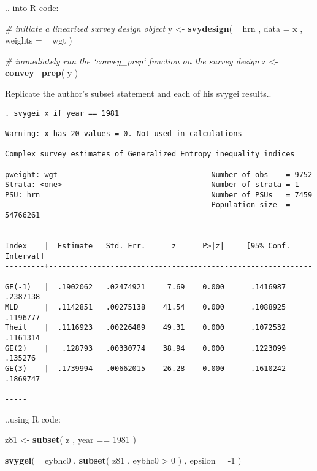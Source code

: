 \documentclass[]{book}
\newenvironment{Shaded}{\begin{snugshade}}{\end{snugshade}}
\newcommand{\KeywordTok}[1]{\textcolor[rgb]{0.13,0.29,0.53}{\textbf{{#1}}}}
\newcommand{\DataTypeTok}[1]{\textcolor[rgb]{0.13,0.29,0.53}{{#1}}}
\newcommand{\DecValTok}[1]{\textcolor[rgb]{0.00,0.00,0.81}{{#1}}}
\newcommand{\StringTok}[1]{\textcolor[rgb]{0.31,0.60,0.02}{{#1}}}
\newcommand{\CommentTok}[1]{\textcolor[rgb]{0.56,0.35,0.01}{\textit{{#1}}}}
\newcommand{\NormalTok}[1]{{#1}}
\theoremstyle{definition}
\theoremstyle{definition}
\theoremstyle{remark}
\begin{document}
.. into R code:

\begin{Shaded}
\begin{Highlighting}[]
\CommentTok{# initiate a linearized survey design object}
\NormalTok{y <-}\StringTok{ }\KeywordTok{svydesign}\NormalTok{( ~}\StringTok{ }\NormalTok{hrn , }\DataTypeTok{data =} \NormalTok{x , }\DataTypeTok{weights =} \NormalTok{~}\StringTok{ }\NormalTok{wgt )}

\CommentTok{# immediately run the `convey_prep` function on the survey design}
\NormalTok{z <-}\StringTok{ }\KeywordTok{convey_prep}\NormalTok{( y )}
\end{Highlighting}
\end{Shaded}

Replicate the author's subset statement and each of his svygei results..

\begin{verbatim}
. svygei x if year == 1981
 
Warning: x has 20 values = 0. Not used in calculations

Complex survey estimates of Generalized Entropy inequality indices
 
pweight: wgt                                   Number of obs    = 9752
Strata: <one>                                  Number of strata = 1
PSU: hrn                                       Number of PSUs   = 7459
                                               Population size  = 54766261
---------------------------------------------------------------------------
Index    |  Estimate   Std. Err.      z      P>|z|     [95% Conf. Interval]
---------+-----------------------------------------------------------------
GE(-1)   |  .1902062   .02474921     7.69    0.000      .1416987   .2387138
MLD      |  .1142851   .00275138    41.54    0.000      .1088925   .1196777
Theil    |  .1116923   .00226489    49.31    0.000      .1072532   .1161314
GE(2)    |   .128793   .00330774    38.94    0.000      .1223099    .135276
GE(3)    |  .1739994   .00662015    26.28    0.000      .1610242   .1869747
---------------------------------------------------------------------------
\end{verbatim}

..using R code:

\begin{Shaded}
\begin{Highlighting}[]
\NormalTok{z81 <-}\StringTok{ }\KeywordTok{subset}\NormalTok{( z , year ==}\StringTok{ }\DecValTok{1981} \NormalTok{)}

\KeywordTok{svygei}\NormalTok{( ~}\StringTok{ }\NormalTok{eybhc0 , }\KeywordTok{subset}\NormalTok{( z81 , eybhc0 >}\StringTok{ }\DecValTok{0} \NormalTok{) , }\DataTypeTok{epsilon =} \NormalTok{-}\DecValTok{1} \NormalTok{)}
\end{Highlighting}
\end{Shaded}
\end{document}
